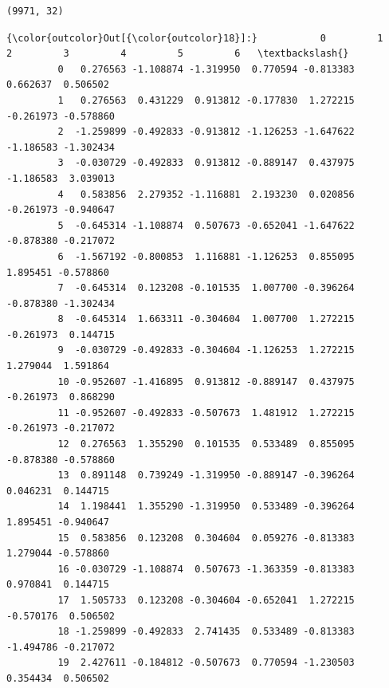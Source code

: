 \documentclass[11pt]{article}
\begin{document}
    \begin{Verbatim}[commandchars=\\\{\}]
(9971, 32)

    \end{Verbatim}

\begin{Verbatim}[commandchars=\\\{\}]
{\color{outcolor}Out[{\color{outcolor}18}]:}           0         1         2         3         4         5         6   \textbackslash{}
         0   0.276563 -1.108874 -1.319950  0.770594 -0.813383  0.662637  0.506502   
         1   0.276563  0.431229  0.913812 -0.177830  1.272215 -0.261973 -0.578860   
         2  -1.259899 -0.492833 -0.913812 -1.126253 -1.647622 -1.186583 -1.302434   
         3  -0.030729 -0.492833  0.913812 -0.889147  0.437975 -1.186583  3.039013   
         4   0.583856  2.279352 -1.116881  2.193230  0.020856 -0.261973 -0.940647   
         5  -0.645314 -1.108874  0.507673 -0.652041 -1.647622 -0.878380 -0.217072   
         6  -1.567192 -0.800853  1.116881 -1.126253  0.855095  1.895451 -0.578860   
         7  -0.645314  0.123208 -0.101535  1.007700 -0.396264 -0.878380 -1.302434   
         8  -0.645314  1.663311 -0.304604  1.007700  1.272215 -0.261973  0.144715   
         9  -0.030729 -0.492833 -0.304604 -1.126253  1.272215  1.279044  1.591864   
         10 -0.952607 -1.416895  0.913812 -0.889147  0.437975 -0.261973  0.868290   
         11 -0.952607 -0.492833 -0.507673  1.481912  1.272215 -0.261973 -0.217072   
         12  0.276563  1.355290  0.101535  0.533489  0.855095 -0.878380 -0.578860   
         13  0.891148  0.739249 -1.319950 -0.889147 -0.396264  0.046231  0.144715   
         14  1.198441  1.355290 -1.319950  0.533489 -0.396264  1.895451 -0.940647   
         15  0.583856  0.123208  0.304604  0.059276 -0.813383  1.279044 -0.578860   
         16 -0.030729 -1.108874  0.507673 -1.363359 -0.813383  0.970841  0.144715   
         17  1.505733  0.123208 -0.304604 -0.652041  1.272215 -0.570176  0.506502   
         18 -1.259899 -0.492833  2.741435  0.533489 -0.813383 -1.494786 -0.217072   
         19  2.427611 -0.184812 -0.507673  0.770594 -1.230503  0.354434  0.506502   
         

\end{Verbatim}
\end{document}
